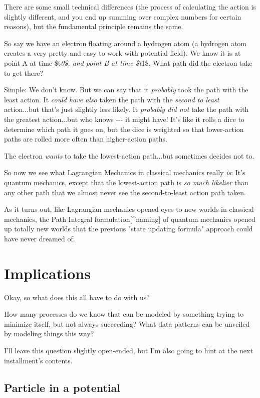 \documentclass[]{article}
\begin{document}
There are some small technical differences (the process of calculating the
action is slightly different, and you end up summing over complex numbers for
certain reasons), but the fundamental principle remains the same.

So say we have an electron floating around a hydrogen atom (a hydrogen atom
creates a very pretty and easy to work with potential field). We know it is at
point A at time \$t\emph{0\$, and point B at time \$t}1\$. What path did the
electron take to get there?

Simple: We don't know. But we can say that it \emph{probably} took the path with
the least action. It \emph{could have also} taken the path with the \emph{second
to least} action...but that's just slightly less likely. It \emph{probably did
not} take the path with the greatest action...but who knows -\/-\/- it might
have! It's like it rolls a dice to determine which path it goes on, but the dice
is weighted so that lower-action paths are rolled more often than higher-action
paths.

The electron \emph{wants} to take the lowest-action path...but sometimes decides
not to.

So now we see what Lagrangian Mechanics in classical mechanics really \emph{is}:
It's quantum mechanics, except that the lowest-action path is \emph{so much
likelier} than any other path that we almost never see the second-to-least
action path taken.

As it turns out, like Lagrangian mechanics opened eyes to new worlds in
classical mechanics, the Path Integral formulation{[}\^{}naming{]} of quantum
mechanics opened up totally new worlds that the previous "state updating
formula" approach could have never dreamed of.

\section{Implications}

Okay, so what does this all have to do with us?

How many processes do we know that can be modeled by something trying to
minimize itself, but not always succeeding? What data patterns can be unveiled
by modeling things this way?

I'll leave this question slightly open-ended, but I'm also going to hint at the
next installment's contents.

\subsection{Particle in a potential}
\end{document}
